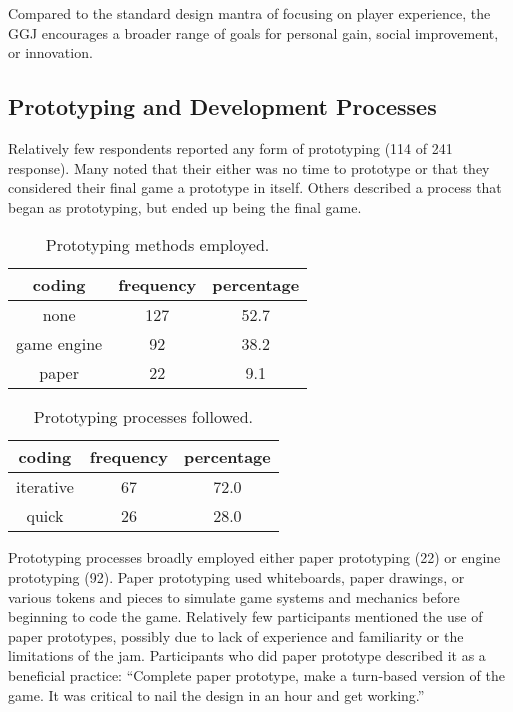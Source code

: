 \documentclass{sig-alternate}
\begin{document}
Compared to the standard design mantra of focusing on player experience, the GGJ encourages a broader range of goals for personal gain, social improvement, or innovation. 


\subsection{Prototyping and Development Processes}
Relatively few respondents reported any form of prototyping (114 of 241 response). Many noted that their either was no time to prototype or that they considered their final game a prototype in itself. Others described a process that began as prototyping, but ended up being the final game.

\begin{table}[tb]
\centering
\scriptsize
\begin{tabular}{|c|c|c|}
\hline coding & frequency & percentage \\ 
\hline none & 127 & 52.7 \\ 
\hline game engine & 92 & 38.2 \\ 
\hline paper & 22 & 9.1 \\ 
\hline 
\end{tabular} 
\caption{Prototyping methods employed.}
\label{tab:prototyping}
\end{table}

\begin{table}[tb]
\centering
\scriptsize
\begin{tabular}{|c|c|c|}
\hline coding & frequency & percentage \\ 
\hline iterative & 67 & 72.0 \\ 
\hline quick & 26 & 28.0 \\ 
\hline 
\end{tabular} 
\caption{Prototyping processes followed.}
\label{tab:proto_process}
\end{table}

Prototyping processes broadly employed either paper prototyping (22) or engine prototyping (92).
Paper prototyping used whiteboards, paper drawings, or various tokens and pieces to simulate game systems and mechanics before beginning to code the game. Relatively few participants mentioned the use of paper prototypes, possibly due to lack of experience and familiarity or the limitations of the jam. Participants who did paper prototype described it as a beneficial practice:
``Complete paper prototype, make a turn-based version of the game. It was critical to nail the design in an hour and get working.''
\end{document}
